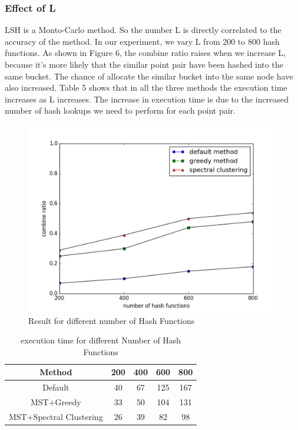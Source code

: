 \documentclass{vldb}
\begin{document}
\subsubsection{Effect of L}
LSH is a Monto-Carlo method. So the number L is directly correlated to the accuracy of the method. In our experiment, we vary L from 200 to 800 hash functions. As shown in Figure 6, the combine ratio raises when we increase L, because it's more likely that the similar point pair have been hashed into the same bucket. The chance of allocate the similar bucket into the same node have also increased. Table 5 shows that in all the three methods the execution time increases as L increases. The increase in execution time is due to the increased  number of hash lookups we need to perform for each point pair.

\begin{figure}
\centering
\includegraphics[scale=0.45]{FHashFunction}
\caption{Result for different number of Hash Functions}
\label{fig:HashFunction}
\end{figure}

\begin{table} [h]
\centering
\caption{execution time for different Number of Hash Functions}
\label{tab:table}
\begin{tabular}{|c|c|c|c|c|} \hline
Method & 200 & 400 & 600 & 800 \\\hline
Default & 40 & 67 & 125 & 167\\\hline
MST+Greedy & 33 & 50 & 104 & 131\\\hline
MST+Spectral Clustering & 26 & 39 & 82 & 98\\\hline
\end{tabular}\\
\end{table}
\end{document}
